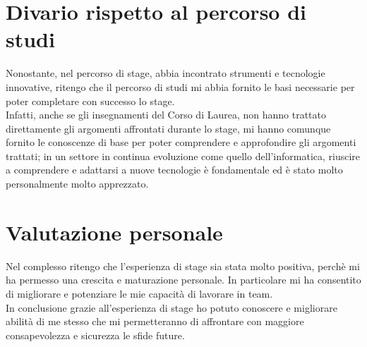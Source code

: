 \section{Divario rispetto al percorso di studi}
Nonostante, nel percorso di stage, abbia incontrato strumenti e tecnologie innovative, ritengo che il percorso di studi 
mi abbia fornito le basi necessarie per poter completare con successo lo stage.\\
Infatti, anche se gli insegnamenti del Corso di Laurea, non hanno trattato direttamente gli argomenti affrontati durante lo stage,
mi hanno comunque fornito le conoscenze di base per poter comprendere e approfondire gli argomenti trattati;
in un settore in continua evoluzione come quello dell'informatica, riuscire a comprendere e adattarsi a nuove tecnologie è fondamentale ed è 
stato molto personalmente molto apprezzato.
\section{Valutazione personale}
Nel complesso ritengo che l'esperienza di stage sia stata molto positiva, perchè 
mi ha permesso una crescita e maturazione personale. In particolare mi ha consentito di
migliorare e potenziare le mie capacità di lavorare in team.\\
In conclusione grazie all'esperienza di stage ho potuto conoscere e migliorare abilità di me stesso
 che mi permetteranno di affrontare con maggiore consapevolezza e sicurezza le sfide future.\\
\newpage
\pagestyle{empty}
\null %
\newpage